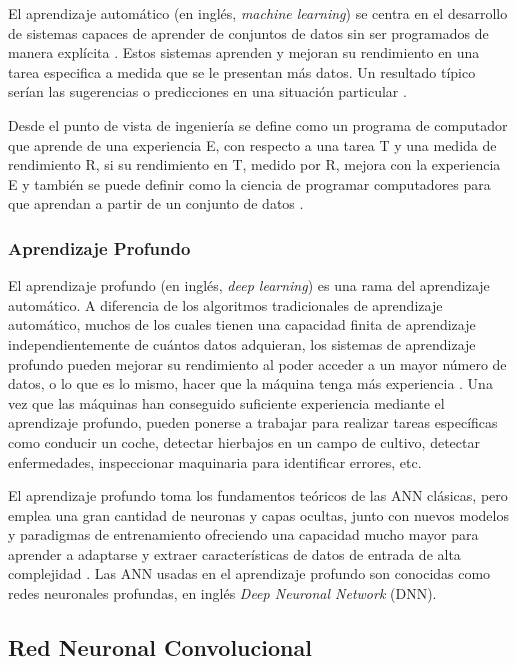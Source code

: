 El aprendizaje automático (en inglés, \textit{machine learning}) se centra en el desarrollo de sistemas capaces de aprender de conjuntos de datos sin ser programados de manera explícita \citep{mitchell1997does}. Estos sistemas aprenden y mejoran su rendimiento en una tarea especifica a medida que se le presentan más datos. Un resultado típico serían las sugerencias o predicciones en una situación particular \citep{vieira2020main}.

Desde el punto de vista de ingeniería se define como un programa de computador que aprende de una experiencia E, con respecto a una tarea T y una medida de rendimiento R, si su rendimiento en T, medido por R, mejora con la experiencia E y también se puede definir como la ciencia de programar computadores para que aprendan a partir de un conjunto de datos \citep{geron2020aprende}.

\subsubsection{Aprendizaje Profundo}

El aprendizaje profundo (en inglés, \textit{deep learning}) es una rama del aprendizaje automático. A diferencia de los algoritmos tradicionales de aprendizaje automático, muchos de los cuales tienen una capacidad finita de aprendizaje independientemente de cuántos datos adquieran, los sistemas de aprendizaje profundo pueden mejorar su rendimiento al poder acceder a un mayor número de datos, o lo que es lo mismo, hacer que la máquina tenga más experiencia \citep{shinde2018review}. Una vez que las máquinas han conseguido suficiente experiencia mediante el aprendizaje profundo, pueden ponerse a trabajar para realizar tareas específicas como conducir un coche, detectar hierbajos en un campo de cultivo, detectar enfermedades, inspeccionar maquinaria para identificar errores, etc.

El aprendizaje profundo toma los fundamentos teóricos de las ANN clásicas, pero emplea una gran cantidad de neuronas y capas ocultas, junto con nuevos modelos y paradigmas de entrenamiento ofreciendo una capacidad mucho mayor para aprender a adaptarse y extraer características de datos de entrada de alta complejidad \citep{schmidhuber2015deep}. Las ANN usadas en el aprendizaje profundo son conocidas como redes neuronales profundas, en inglés \textit{Deep Neuronal Network} (DNN).

\subsection{Red Neuronal Convolucional}

